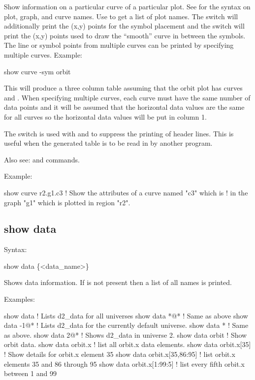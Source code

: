 {{{{{{{{Show information on a particular curve of a particular plot. See  for the
syntax on plot, graph, and curve names.  Use  to get a list of plot
names. The  switch will additionally print the (x,y) points for the symbol
placement and the  switch will print the (x,y) points used to draw the
``smooth'' curve in between the symbols. The line or symbol points from multiple curves
can be printed by specifying multiple curves. Example:
\begin{example}
  show curve -sym orbit
\end{example}
This will produce a three column table assuming that the orbit plot has curves
 and . When specifying multiple curves, each curve must have
the same number of data points and it will be assumed that the horizontal data values are
the same for all curves so the horizontal data values will be put in column 1.

The  switch is used with  and  to suppress the
printing of header lines. This is useful when the generated table is to be read in by
another program.

Also see:  and  commands.

Example:
\begin{example}
  show curve r2.g1.c3     ! Show the attributes of a curve named "c3" which is 
                          !   in the graph "g1" which is plotted in region "r2".
\end{example}


\subsection{show data}
\label{s:show.data}

Syntax:
\begin{example}
  show data \{<data_name>\}
\end{example}

Shows data information. If  is not present then a list of all 
names is printed.

Examples:
\begin{example}
  show data                   ! Lists d2_data for all universes
  show data *@*               ! Same as above
  show data -1@*              ! Lists d2_data for the currently default universe.
  show data *                 ! Same as above.
  show data 2@*               ! Shows d2_data in universe 2.
  show data orbit             ! Show orbit data.
  show data orbit.x           ! list all orbit.x data elements.
  show data orbit.x[35]       ! Show details for orbit.x element 35
  show data orbit.x[35,86:95] ! list orbit.x elements 35 and 86 through 95
  show data orbit.x[1:99:5]   ! list every fifth orbit.x between 1 and 99  
\end{example}

}}}}}}}}
